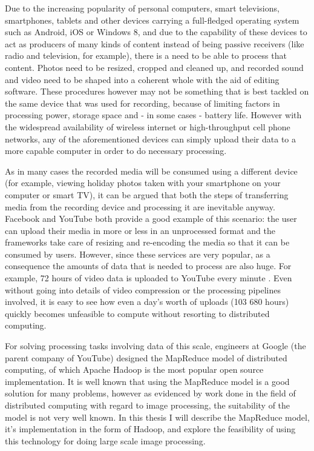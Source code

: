 \documentclass [12pt,a4paper]{report}
\begin{document}
Due to the increasing popularity of personal computers, smart televisions, smartphones, tablets and other devices carrying a full-fledged operating system such as Android, iOS or Windows 8, and due to the capability of these devices to act as producers of many kinds of content instead of being passive receivers (like radio and television, for example), there is a need to be able to process that content. Photos need to be resized, cropped and cleaned up, and recorded sound and video need to be shaped into a coherent whole with the aid of editing software. These procedures however may not be something that is best tackled on the same device that was used for recording, because of limiting factors in processing power, storage space and - in some cases - battery life. However with the widespread availability of wireless internet or high-throughput cell phone networks, any of the aforementioned devices can simply upload their data to a more capable computer in order to do necessary processing. 

As in many cases the recorded media will be consumed using a different device (for example, viewing holiday photos taken with your smartphone on your computer or smart TV), it can be argued that both the steps of transferring media from the recording device and processing it are inevitable anyway. Facebook and YouTube both provide a good example of this scenario: the user can upload their media in more or less in an unprocessed format and the frameworks take care of resizing and re-encoding the media so that it can be consumed by users. However, since these services are very popular, as a consequence the amounts of data that is needed to process are also huge. For example, 72 hours of video data is uploaded to YouTube every minute \cite{youtube_stats}. Even without going into details of video compression or the processing pipelines involved, it is easy to see how even a day's worth of uploads (103 680 hours) quickly becomes unfeasible to compute without resorting to distributed computing.

For solving processing tasks involving data of this scale, engineers at Google (the parent company of YouTube) designed the MapReduce model of distributed computing, of which Apache Hadoop is the most popular open source implementation. It is well known that using the MapReduce model is a good solution for many problems, however as evidenced by work done in the field of distributed computing with regard to image processing, the suitability of the model is not very well known. In this thesis I will describe the MapReduce model, it's implementation in the form of Hadoop, and explore the feasibility of using this technology for doing large scale image processing.
\end{document}
